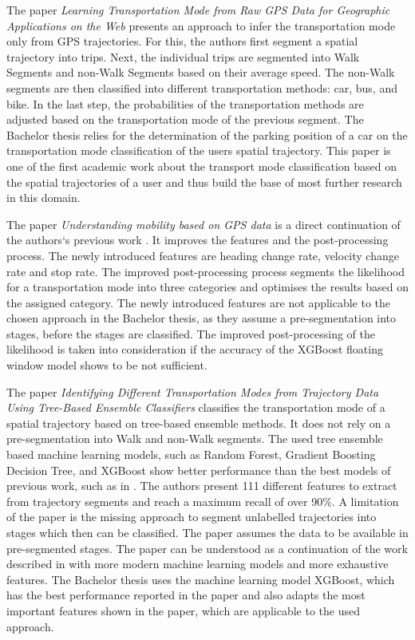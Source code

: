 The paper \textit{Learning Transportation Mode from Raw GPS Data for Geographic Applications on the Web} \cite{Zheng2008} presents an approach to infer the transportation mode only from GPS trajectories. For this, the authors first segment a spatial trajectory into trips. Next, the individual trips are segmented into Walk Segments and non-Walk Segments based on their average speed. The non-Walk segments are then classified into different transportation methods: car, bus, and bike. In the last step, the probabilities of the transportation methods are adjusted based on the transportation mode of the previous segment. \newline
The Bachelor thesis relies for the determination of the parking position of a car on the transportation mode classification of the users spatial trajectory. This paper is one of the first academic work about the transport mode classification based on the spatial trajectories of a user and thus build the base of most further research in this domain.

The paper \textit{Understanding mobility based on GPS data} \cite{zheng2008understanding} is a direct continuation of the authors`s previous work \cite{Zheng2008}. It improves the features and the post-processing process. The newly introduced features are heading change rate, velocity change rate and stop rate. The improved post-processing process segments the likelihood for a transportation mode into three categories and optimises the results based on the assigned category. \newline
The newly introduced features are not applicable to the chosen approach in the Bachelor thesis, as they assume a pre-segmentation into stages, before the stages are classified. The improved post-processing of the likelihood is taken into consideration if the accuracy of the XGBoost floating window model shows to be not sufficient. 

The paper \textit{Identifying Different Transportation Modes from Trajectory Data Using Tree-Based Ensemble Classifiers} \cite{Xiao2017} classifies the transportation mode of a spatial trajectory based on tree-based ensemble methods. It does not rely on a pre-segmentation into Walk and non-Walk segments. The used tree ensemble based machine learning models, such as Random Forest, Gradient Boosting Decision Tree, and XGBoost show better performance than the best models of previous work, such as in \cite{Zheng2008}. The authors present 111 different features to extract from trajectory segments and reach a maximum recall of over 90\%. A limitation of the paper is the missing approach to segment unlabelled trajectories into stages which then can be classified. The paper assumes the data to be available in pre-segmented stages.\newline
The paper can be understood as a continuation of the work described in \cite{Zheng2008} with more modern machine learning models and more exhaustive features. The Bachelor thesis uses the machine learning model XGBoost, which has the best performance reported in the paper and also adapts the most important features shown in the paper, which are applicable to the used approach. \cite{chen2016xgboost}

